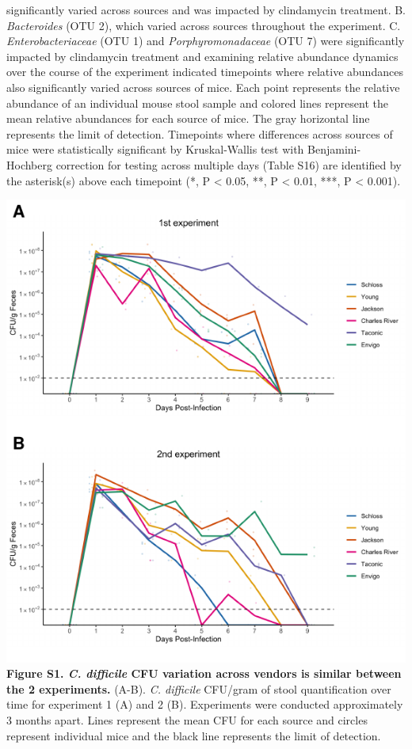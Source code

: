 \documentclass[11pt,]{article}
\begin{document}
significantly varied across sources and was impacted by clindamycin
treatment. B. \emph{Bacteroides} (OTU 2), which varied across sources
throughout the experiment. C. \emph{Enterobacteriaceae} (OTU 1) and
\emph{Porphyromonadaceae} (OTU 7) were significantly impacted by
clindamycin treatment and examining relative abundance dynamics over the
course of the experiment indicated timepoints where relative abundances
also significantly varied across sources of mice. Each point represents
the relative abundance of an individual mouse stool sample and colored
lines represent the mean relative abundances for each source of mice.
The gray horizontal line represents the limit of detection. Timepoints
where differences across sources of mice were statistically significant
by Kruskal-Wallis test with Benjamini-Hochberg correction for testing
across multiple days (Table S16) are identified by the asterisk(s) above
each timepoint (*, P \textless{} 0.05, **, P \textless{} 0.01, ***, P
\textless{} 0.001).

\newpage

\includegraphics{figure_S1.pdf} \textbf{Figure S1. \emph{C. difficile}
CFU variation across vendors is similar between the 2 experiments.}
(A-B). \emph{C. difficile} CFU/gram of stool quantification over time
for experiment 1 (A) and 2 (B). Experiments were conducted approximately
3 months apart. Lines represent the mean CFU for each source and circles
represent individual mice and the black line represents the limit of
detection.
\end{document}
